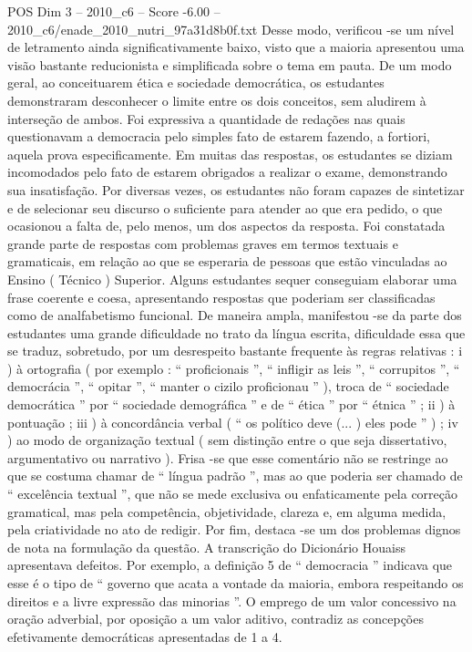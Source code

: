 \begin{textsample}{POS Dim 3 – 2010\_c6 – Score -6.00 – 2010\_c6/enade\_2010\_nutri\_97a31d8b0f.txt}
Desse modo, verificou -se um nível de letramento ainda significativamente baixo, visto que a maioria apresentou uma visão bastante reducionista e simplificada sobre o tema em pauta.
De um modo geral, ao conceituarem ética e sociedade democrática, os estudantes demonstraram desconhecer o limite entre os dois conceitos, sem aludirem à interseção de ambos.
Foi expressiva a quantidade de redações nas quais questionavam a democracia pelo simples fato de estarem fazendo, a fortiori, aquela prova especificamente.
Em muitas das respostas, os estudantes se diziam incomodados pelo fato de estarem obrigados a realizar o exame, demonstrando sua insatisfação.
Por diversas vezes, os estudantes não foram capazes de sintetizar e de selecionar seu discurso o suficiente para atender ao que era pedido, o que ocasionou a falta de, pelo menos, um dos aspectos da resposta.
Foi constatada grande parte de respostas com problemas graves em termos textuais e gramaticais, em relação ao que se esperaria de pessoas que estão vinculadas ao Ensino ( Técnico ) Superior.
Alguns estudantes sequer conseguiam elaborar uma frase coerente e coesa, apresentando respostas que poderiam ser classificadas como de analfabetismo funcional.
De maneira ampla, manifestou -se da parte dos estudantes uma grande dificuldade no trato da língua escrita, dificuldade essa que se traduz, sobretudo, por um desrespeito bastante frequente às regras relativas : i ) à ortografia ( por exemplo : “ proficionais ”, “ infligir as leis ”, “ corrupitos ”, “ democrácia ”, “ opitar ”, “ manter o cizilo proficionau ” ), troca de “ sociedade democrática ” por “ sociedade demográfica ” e de “ ética ” por “ étnica ” ; ii ) à pontuação ; iii ) à concordância verbal ( “ os político deve (... ) eles pode ” ) ; iv ) ao modo de organização textual ( sem distinção entre o que seja dissertativo, argumentativo ou narrativo ).
Frisa -se que esse comentário não se restringe ao que se costuma chamar de “ língua padrão ”, mas ao que poderia ser chamado de “ excelência textual ”, que não se mede exclusiva ou enfaticamente pela correção gramatical, mas pela competência, objetividade, clareza e, em alguma medida, pela criatividade no ato de redigir.
Por fim, destaca -se um dos problemas dignos de nota na formulação da questão.
A transcrição do Dicionário Houaiss apresentava defeitos.
Por exemplo, a definição 5 de “ democracia ” indicava que esse é o tipo de “ governo que acata a vontade da maioria, embora respeitando os direitos e a livre expressão das minorias ”.
O emprego de um valor concessivo na oração adverbial, por oposição a um valor aditivo, contradiz as concepções efetivamente democráticas apresentadas de 1 a 4.

\end{textsample}
